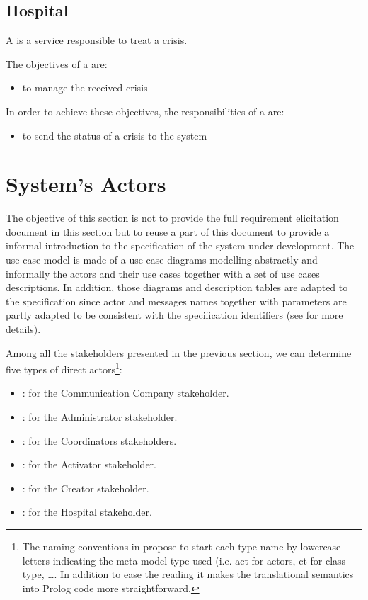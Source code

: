 \subsection{Hospital}

A  is a service responsible to treat a crisis.

The objectives of a  are:
\begin{itemize}
  \item to manage the received crisis
\end{itemize}
\vspace{0.5cm}
In order to achieve these objectives, the responsibilities of a
 are:
\begin{itemize}
  \item to send the status of a crisis to the system
\end{itemize}

\newpage

\section{System's Actors}
\label{sec:lu.uni.lassy.excalibur.examples.icrash-gendescr-actors}

The objective of this section is not to provide the full requirement elicitation document in this section but to reuse a part of this document to provide a informal introduction to the \msrmessir specification of the system under development. The use case model is made of a use case diagrams modelling abstractly and informally the actors and their use cases together with a set of use cases descriptions. 
In addition, those diagrams and description tables are adapted to the \msrmessir specification since actor and messages names together with parameters are partly adapted to be consistent with the specification identifiers (see \cite{messirbook} for more details). 

Among all the stakeholders presented in the previous section, we can determine five types of \glspl{direct actor}\footnote{The naming conventions in \msrmessir propose to start each type name by lowercase letters indicating the meta model type used (i.e. act for actors, ct for class type, \ldots. In addition to ease the reading it makes the translational semantics into Prolog code more straightforward.}: 
\begin{itemize}
  \item {}: for the Communication Company stakeholder.
  \item {}: for the Administrator stakeholder.
  \item {}: for the Coordinators stakeholders.
  \item {}: for the Activator stakeholder.
  \item {}: for the Creator stakeholder.
  \item {}: for the Hospital stakeholder.
\end{itemize}
 
